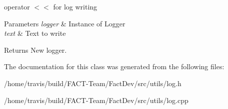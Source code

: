 operator $<$$<$ for log writing 


\begin{DoxyParams}{Parameters}
{\em logger} & Instance of Logger \\
\hline
{\em text} & Text to write \\
\hline
\end{DoxyParams}
\begin{DoxyReturn}{Returns}
New logger. 
\end{DoxyReturn}


The documentation for this class was generated from the following files\-:\begin{DoxyCompactItemize}
\item 
/home/travis/build/\-F\-A\-C\-T-\/\-Team/\-Fact\-Dev/src/utils/log.\-h\item 
/home/travis/build/\-F\-A\-C\-T-\/\-Team/\-Fact\-Dev/src/utils/log.\-cpp\end{DoxyCompactItemize}
